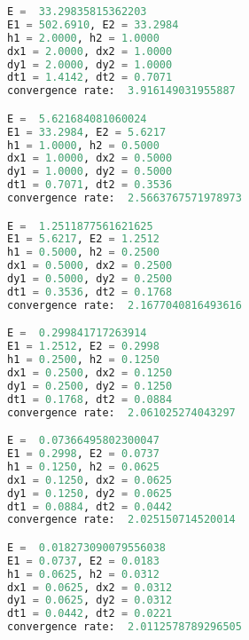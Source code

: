 \documentclass{report}
\begin{document}
        \begin{lstlisting}[language=Python]
E =  33.29835815362203
E1 = 502.6910, E2 = 33.2984
h1 = 2.0000, h2 = 1.0000
dx1 = 2.0000, dx2 = 1.0000
dy1 = 2.0000, dy2 = 1.0000
dt1 = 1.4142, dt2 = 0.7071
convergence rate:  3.916149031955887

E =  5.621684081060024
E1 = 33.2984, E2 = 5.6217
h1 = 1.0000, h2 = 0.5000
dx1 = 1.0000, dx2 = 0.5000
dy1 = 1.0000, dy2 = 0.5000
dt1 = 0.7071, dt2 = 0.3536
convergence rate:  2.5663767571978973

E =  1.2511877561621625
E1 = 5.6217, E2 = 1.2512
h1 = 0.5000, h2 = 0.2500
dx1 = 0.5000, dx2 = 0.2500
dy1 = 0.5000, dy2 = 0.2500
dt1 = 0.3536, dt2 = 0.1768
convergence rate:  2.1677040816493616

E =  0.299841717263914
E1 = 1.2512, E2 = 0.2998
h1 = 0.2500, h2 = 0.1250
dx1 = 0.2500, dx2 = 0.1250
dy1 = 0.2500, dy2 = 0.1250
dt1 = 0.1768, dt2 = 0.0884
convergence rate:  2.061025274043297

E =  0.07366495802300047
E1 = 0.2998, E2 = 0.0737
h1 = 0.1250, h2 = 0.0625
dx1 = 0.1250, dx2 = 0.0625
dy1 = 0.1250, dy2 = 0.0625
dt1 = 0.0884, dt2 = 0.0442
convergence rate:  2.025150714520014

E =  0.018273090079556038
E1 = 0.0737, E2 = 0.0183
h1 = 0.0625, h2 = 0.0312
dx1 = 0.0625, dx2 = 0.0312
dy1 = 0.0625, dy2 = 0.0312
dt1 = 0.0442, dt2 = 0.0221
convergence rate:  2.0112578789296505
        \end{lstlisting}
\end{document}
